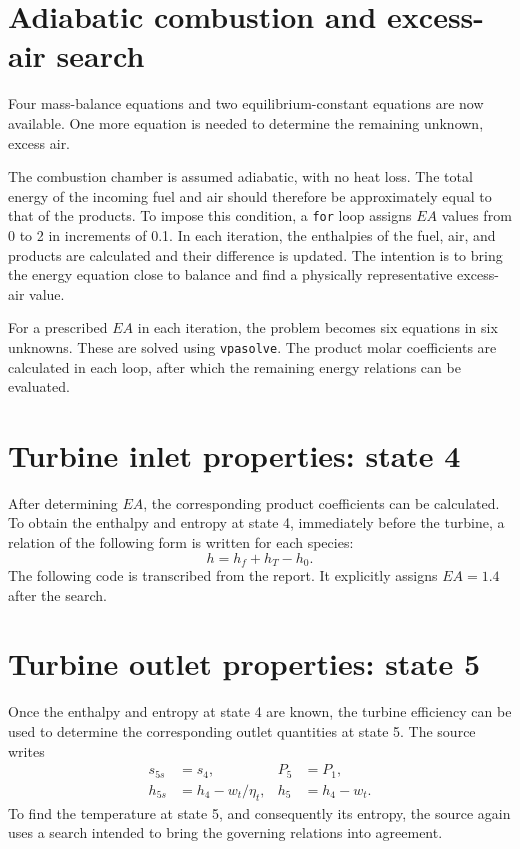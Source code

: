 \documentclass[11pt,a4paper]{article}
\begin{document}
\section{Adiabatic combustion and excess-air search}
Four mass-balance equations and two equilibrium-constant equations are now available. One more equation is needed to determine the remaining unknown, excess air.

The combustion chamber is assumed adiabatic, with no heat loss. The total energy of the incoming fuel and air should therefore be approximately equal to that of the products. To impose this condition, a \texttt{for} loop assigns $EA$ values from 0 to 2 in increments of 0.1. In each iteration, the enthalpies of the fuel, air, and products are calculated and their difference is updated. The intention is to bring the energy equation close to balance and find a physically representative excess-air value.

For a prescribed $EA$ in each iteration, the problem becomes six equations in six unknowns. These are solved using \texttt{vpasolve}. The product molar coefficients are calculated in each loop, after which the remaining energy relations can be evaluated.

\section{Turbine inlet properties: state 4}
After determining $EA$, the corresponding product coefficients can be calculated. To obtain the enthalpy and entropy at state 4, immediately before the turbine, a relation of the following form is written for each species:
\begin{equation}h=h_f+h_T-h_0.\end{equation}
The following code is transcribed from the report. It explicitly assigns $EA=1.4$ after the search.

\section{Turbine outlet properties: state 5}
Once the enthalpy and entropy at state 4 are known, the turbine efficiency can be used to determine the corresponding outlet quantities at state 5. The source writes
\begin{align}s_{5s}&=s_4,&P_5&=P_1,\\h_{5s}&=h_4-w_t/\eta_t,&h_5&=h_4-w_t.\end{align}
To find the temperature at state 5, and consequently its entropy, the source again uses a search intended to bring the governing relations into agreement.

\end{document}
